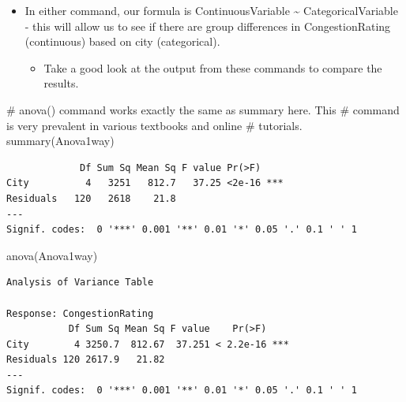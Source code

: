 \documentclass[
  letterpaper,
  DIV=11,
  numbers=noendperiod]{scrreprt}
\newenvironment{Shaded}{\begin{snugshade}}{\end{snugshade}}
\newcommand{\CommentTok}[1]{\textcolor[rgb]{0.37,0.37,0.37}{#1}}
\newcommand{\FunctionTok}[1]{\textcolor[rgb]{0.28,0.35,0.67}{#1}}
\newcommand{\NormalTok}[1]{\textcolor[rgb]{0.00,0.23,0.31}{#1}}
\providecommand{\tightlist}{%
  \setlength{\itemsep}{0pt}\setlength{\parskip}{0pt}}\usepackage{longtable,booktabs,array}
\begin{document}
\begin{itemize}
\item
  In either command, our formula is ContinuousVariable \textasciitilde{}
  CategoricalVariable - this will allow us to see if there are group
  differences in CongestionRating (continuous) based on city
  (categorical).

  \begin{itemize}
  \tightlist
  \item
    Take a good look at the output from these commands to compare the
    results.
  \end{itemize}
\end{itemize}

\begin{Shaded}
\begin{Highlighting}[]
\CommentTok{\# anova() command works exactly the same as summary here.  This}
\CommentTok{\# command is very prevalent in various textbooks and online}
\CommentTok{\# tutorials.}
\FunctionTok{summary}\NormalTok{(Anova1way)}
\end{Highlighting}
\end{Shaded}

\begin{verbatim}
             Df Sum Sq Mean Sq F value Pr(>F)    
City          4   3251   812.7   37.25 <2e-16 ***
Residuals   120   2618    21.8                   
---
Signif. codes:  0 '***' 0.001 '**' 0.01 '*' 0.05 '.' 0.1 ' ' 1
\end{verbatim}

\begin{Shaded}
\begin{Highlighting}[]
\FunctionTok{anova}\NormalTok{(Anova1way)}
\end{Highlighting}
\end{Shaded}

\begin{verbatim}
Analysis of Variance Table

Response: CongestionRating
           Df Sum Sq Mean Sq F value    Pr(>F)    
City        4 3250.7  812.67  37.251 < 2.2e-16 ***
Residuals 120 2617.9   21.82                      
---
Signif. codes:  0 '***' 0.001 '**' 0.01 '*' 0.05 '.' 0.1 ' ' 1
\end{verbatim}
\end{document}
